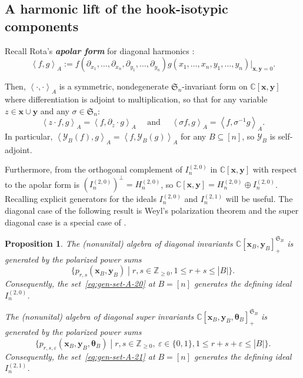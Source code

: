 \documentclass[11pt, noadjust, reqno]{amsart}
\newtheorem{proposition}[theorem]{Proposition}
\theoremstyle{definition}
\theoremstyle{remark}
\numberwithin{equation}{section}
\newcommand{\0}{\emptyset}
\newcommand{\Z}{\mathbb{Z}}
\newcommand{\C}{\mathbb{C}}
\renewcommand{\S}{\mathfrak{S}}
\newcommand{\cY}{\mathcal{Y}}
\newcommand{\newword}[1]{\emph{\textbf{#1}}}
\begin{document}
\subsection{A harmonic lift of the hook-isotypic components}\label{subsec:harmoniclift}

Recall Rota's \newword{apolar form} for diagonal harmonics \cite[Section 1.3]{Haiman1994}: 
\begin{equation}\label{eq:Rota-apolar-form}
\left\langle f,g \right\rangle_A := f(\partial_{x_1}, \dots, \partial_{x_n}, \partial_{y_1}, \dots, \partial_{y_n}) g(x_1, \dots, x_n, y_1, \dots, y_n)|_{\bm{x}, \bm{y}=0}.
\end{equation}

Then, $\left\langle \cdot, \cdot \right\rangle_A$ is a symmetric, nondegenerate $\mathfrak{S}_n$-invariant form on $\C[\bm{x},\bm{y}]$ where differentiation is adjoint to multiplication, so that for any variable $z \in \bm{x} \cup \bm{y}$ and any $\sigma \in \S_n$:
\[
\left\langle z \cdot f, g \right\rangle_A = \left\langle f, \partial_z \cdot g\right\rangle_A \quad\text{ and }\quad \left\langle \sigma f, g \right\rangle_A = \left\langle f, \sigma^{-1} g \right\rangle_A.
\]
In particular, $\left\langle \cY_B(f),g \right\rangle_A = \left\langle f, \cY_B(g)\right\rangle_A$ for any $B \subseteq [n]$, so $\cY_B$ is self-adjoint.

Furthermore, from \cite[Section 1.3]{Haiman1994} the orthogonal complement of $I_n^{(2,0)}$ in $\C[\bm{x},\bm{y}]$ with respect to the apolar form is $(I_n^{(2,0)})^\perp = H_n^{(2,0)}$, so $\C[\bm{x},\bm{y}] = H_n^{(2,0)} \oplus I_n^{(2,0)}$.
Recalling explicit generators for the ideals $I_n^{(2,0)}$ and $I_n^{(2,1)}$ will be useful.
The diagonal case of the following result is Weyl's polarization theorem \cite{Weyl} and the super diagonal case is a special case of \cite[Theorem 17]{OrellanaZabrocki}.

\begin{proposition}\label{prop:ideal-generators}
    The (nonunital) algebra of diagonal invariants
    $\C[\bm{x}_B, \bm{y}_B]_+^{\mathfrak{S}_B}$ is generated by the polarized power sums
    \begin{equation}\label{eq:gen-set-A-20}
    \{ p_{r,s}(\bm{x}_B,\bm{y}_B) \;| \;
        r,s \in \Z_{\geq 0}, 1 \leq r+s \leq |B|\}.
\end{equation}
    Consequently, the set~\eqref{eq:gen-set-A-20} at $B = [n]$ generates the defining ideal $I_{n}^{(2,0)}$.

        The (nonunital) algebra of diagonal super invariants
    $\C[\bm{x}_B, \bm{y}_B, \bm{\theta}_B]_+^{\mathfrak{S}_B}$ is generated by the polarized power sums
    \begin{equation}\label{eq:gen-set-A-21}
\{ p_{r,s,\varepsilon}(\bm{x}_B,\bm{y}_B,\bm{\theta}_B) \;|\;
        r,s \in \Z_{\geq 0},\ \varepsilon \in \{0,1\}, 1 \leq r+s+\varepsilon \leq |B| \}.
\end{equation}
    Consequently, the set~\eqref{eq:gen-set-A-21} at $B = [n]$ generates the defining ideal $I_{n}^{(2,1)}$.
\end{proposition}
\end{document}
